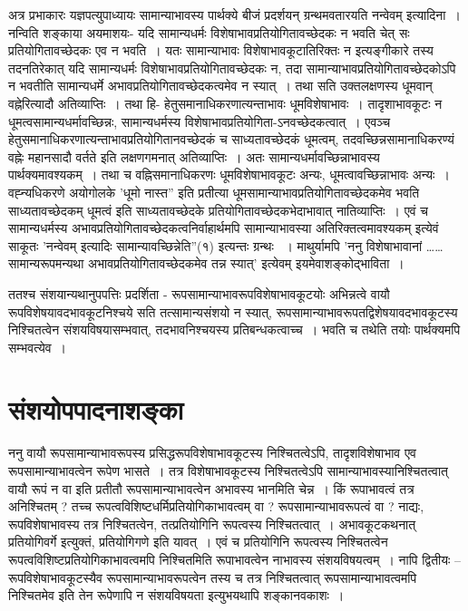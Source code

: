 {अत्र प्रभाकारः यज्ञपत्युपाध्यायः सामान्याभावस्य पार्थक्ये बीजं प्रदर्शयन् ग्रन्थमवतारयति नन्वेवम् इत्यादिना~। नन्विति शङ्काया अयमाशयः- यदि सामान्यधर्मः विशेषाभावप्रतियोगितावच्छेदकः न भवति चेत् सः प्रतियोगितावच्छेदकः एव न भवति~।  यतः सामान्याभावः विशेषाभावकूटातिरिक्तः न इत्यङ्गीकारे तस्य तदनतिरेकात् यदि सामान्यधर्मः विशेषाभावप्रतियोगितावच्छेदकः न, तदा सामान्याभावप्रतियोगितावच्छेदकोऽपि न भवतीति सामान्यधर्मे अभावप्रतियोगितावच्छेदकत्वमेव न स्यात्~। तथा सति उक्तलक्षणस्य धूमवान् वह्नेरित्यादौ अतिव्याप्तिः~। तथा हि- हेतुसमानाधिकरणात्यन्ताभावः धूमविशेषाभावः~। तादृशाभावकूटः न धूमत्वसामान्यधर्मावच्छिन्नः, सामान्यधर्मस्य विशेषाभावप्रतियोगिता-ऽनवच्छेदकत्वात्~। एवञ्च हेतुसमानाधिकरणात्यन्ताभावप्रतियोगितानवच्छेदकं च साध्यतावच्छेदकं धूमत्वम्, तदवच्छिन्नसामानाधिकरण्यं वह्नेः महानसादौ वर्तते इति लक्षणगमनात् अतिव्याप्तिः~। अतः सामान्यधर्मावच्छिन्नाभावस्य पार्थक्यमावश्यकम्~। तथा च वह्निसमानाधिकरणः धूमविशेषाभावकूटः अन्यः, धूमत्वावच्छिन्नाभावः अन्यः~। वह्न्यधिकरणे अयोगोलके ’धूमो नास्त” इति प्रतीत्या धूमसामान्याभावप्रतियोगितावच्छेदकमेव भवति साध्यतावच्छेदकम् धूमत्वं इति साध्यतावच्छेदके प्रतियोगितावच्छेदकभेदाभावात् नातिव्याप्तिः~। एवं च सामान्यधर्मस्य अभावप्रतियोगितावच्छेदकत्वनिर्वाहार्थमपि सामान्याभावस्या अतिरिक्तत्वमावश्यकम् इत्येवं साकूतः ’नन्वेवम् इत्यादिः सामान्यावच्छिन्नेति”(१) इत्यन्तः ग्रन्थः  ~। माथुर्यामपि ’ननु विशेषाभावानां …… सामान्यरूपमन्यथा अभावप्रतियोगितावच्छेदकमेव तन्न स्यात्’ इत्येवम् इयमेवाशङ्कोद्भाविता~। 

ततश्च संशयान्यथानुपपत्तिः प्रदर्शिता - रूपसामान्याभावरूपविशेषाभावकूटयोः अभिन्नत्वे वायौ रूपविशेषयावदभावकूटनिश्चये सति तत्सामान्यसंशयो न स्यात्, रूपसामान्याभावरूपतद्विशेषयावदभावकूटस्य निश्चितत्वेन संशयविषयासम्भवात्, तदभावनिश्चयस्य प्रतिबन्धकत्वाच्च~। भवति च तथेति तयोः पार्थक्यमपि सम्भवत्येव~। 

\section*{संशयोपपादनाशङ्का}

ननु वायौ रूपसामान्याभावरूपस्य प्रसिद्धरूपविशेषाभावकूटस्य निश्चितत्वेऽपि, तादृशविशेषाभाव एव रूपसामान्याभावत्वेन रूपेण भासते~। तत्र विशेषाभावकूटस्य निश्चितत्वेऽपि सामान्याभावस्यानिश्चितत्वात् वायौ रूपं न वा इति प्रतीतौ रूपसामान्याभावत्वेन अभावस्य भानमिति चेन्न~। किं रूपाभावत्वं तत्र अनिश्चितम् ? तच्च रूपत्वविशिष्टधर्मिप्रतियोगिकाभावत्वम् वा ? रूपसामान्याभावरूपत्वं वा ? नाद्यः, रूपविशेषाभावस्य तत्र निश्चितत्वेन, तत्प्रतियोगिनि रूपत्वस्य निश्चितत्वात्~। अभावकूटकथनात् प्रतियोगिवर्गे इत्युक्तं, प्रतियोगिगणे इति यावत्~। एवं च प्रतियोगिनि रूपत्वस्य निश्चितत्वेन रूपत्वविशिष्टप्रतियोगिकाभावत्वमपि निश्चितमिति रूपाभावत्वेन नाभावस्य संशयविषयत्वम्~। नापि द्वितीयः – रूपविशेषाभावकूटस्यैव रूपसामान्याभावरूपत्वेन तस्य च तत्र निश्चितत्वात् रूपसामान्याभावत्वमपि निश्चितमेव इति तेन रूपेणापि न संशयविषयता इत्युभयथापि शङ्कानवकाशः~। 

}
